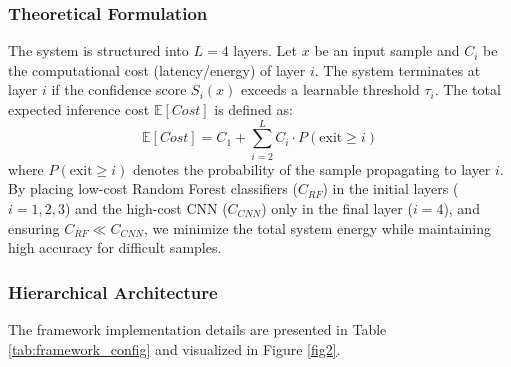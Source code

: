 \subsubsection{Theoretical Formulation}
The system is structured into $L=4$ layers. Let $x$ be an input sample and $C_i$ be the computational cost (latency/energy) of layer $i$. The system terminates at layer $i$ if the confidence score $S_i(x)$ exceeds a learnable threshold $\tau_i$. The total expected inference cost $\mathbb{E}[Cost]$ is defined as:
\begin{equation}
\mathbb{E}[Cost] = C_1 + \sum_{i=2}^{L} C_i \cdot P(\text{exit} \ge i)
\end{equation}
where $P(\text{exit} \ge i)$ denotes the probability of the sample propagating to layer $i$. By placing low-cost Random Forest classifiers ($C_{RF}$) in the initial layers ($i=1,2,3$) and the high-cost CNN ($C_{CNN}$) only in the final layer ($i=4$), and ensuring $C_{RF} \ll C_{CNN}$, we minimize the total system energy while maintaining high accuracy for difficult samples.

\subsubsection{Hierarchical Architecture}
The framework implementation details are presented in Table \ref{tab:framework_config} and visualized in Figure \ref{fig2}.

